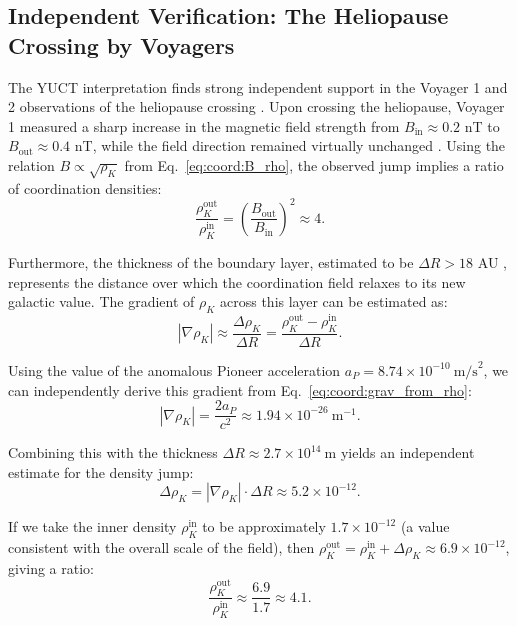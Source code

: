 \documentclass[12pt,a4paper]{article}
\theoremstyle{remark}
\begin{document}
	\subsection{Independent Verification: The Heliopause Crossing by Voyagers}
	\label{subsec:coord:voyager}
	
	The YUCT interpretation finds strong independent support in the Voyager 1 and 2 observations of the heliopause crossing \cite{Burlaga2013}. Upon crossing the heliopause, Voyager 1 measured a sharp increase in the magnetic field strength from \(B_{\text{in}} \approx 0.2\) nT to \(B_{\text{out}} \approx 0.4\) nT, while the field direction remained virtually unchanged \cite{Burlaga2013}. Using the relation \(B \propto \sqrt{\rho_K}\) from Eq.~\eqref{eq:coord:B_rho}, the observed jump implies a ratio of coordination densities:
	\begin{equation}
		\frac{\rho_K^{\text{out}}}{\rho_K^{\text{in}}} = \left( \frac{B_{\text{out}}}{B_{\text{in}}} \right)^2 \approx 4.
		\label{eq:coord:rho_ratio_voyager}
	\end{equation}
	
	Furthermore, the thickness of the boundary layer, estimated to be \(\Delta R > 18\) AU \cite{Richardson2024}, represents the distance over which the coordination field relaxes to its new galactic value. The gradient of \(\rho_K\) across this layer can be estimated as:
	\begin{equation}
		|\nabla \rho_K| \approx \frac{\Delta \rho_K}{\Delta R} = \frac{\rho_K^{\text{out}} - \rho_K^{\text{in}}}{\Delta R}.
		\label{eq:coord:gradient_estimate}
	\end{equation}
	
	Using the value of the anomalous Pioneer acceleration \(a_P = 8.74 \times 10^{-10}\ \text{m/s}^2\), we can independently derive this gradient from Eq.~\eqref{eq:coord:grav_from_rho}:
	\begin{equation}
		|\nabla \rho_K| = \frac{2a_P}{c^2} \approx 1.94 \times 10^{-26}\ \text{m}^{-1}.
		\label{eq:coord:gradient_pioneer}
	\end{equation}
	
	Combining this with the thickness \(\Delta R \approx 2.7 \times 10^{14}\ \text{m}\) yields an independent estimate for the density jump:
	\begin{equation}
		\Delta \rho_K = |\nabla \rho_K| \cdot \Delta R \approx 5.2 \times 10^{-12}.
		\label{eq:coord:delta_rho_pioneer}
	\end{equation}
	
	If we take the inner density \(\rho_K^{\text{in}}\) to be approximately \(1.7 \times 10^{-12}\) (a value consistent with the overall scale of the field), then \(\rho_K^{\text{out}} = \rho_K^{\text{in}} + \Delta \rho_K \approx 6.9 \times 10^{-12}\), giving a ratio:
	\begin{equation}
		\frac{\rho_K^{\text{out}}}{\rho_K^{\text{in}}} \approx \frac{6.9}{1.7} \approx 4.1.
		\label{eq:coord:rho_ratio_pioneer}
	\end{equation}
	
\end{document}
